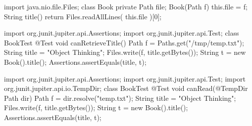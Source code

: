 \documentclass{article}
\begin{document}
\begin{lnSnippet}
import java.nio.file.Files;
class Book {
  private Path file;
  Book(Path f) {
    this.file = f;
  }
  String title() {
    return Files.readAllLines(
      this.file
    )[0];
  }
}
\end{lnSnippet}
\begin{lnSnippet}
import org.junit.jupiter.api.Assertions;
import org.junit.jupiter.api.Test;
class BookTest {
  @Test
  void canRetrieveTitle() {
    Path f = Paths.get("/tmp/temp.txt");
    String title = "Object Thinking";
    Files.write(f, title.getBytes());
    String t = new Book().title();
    Assertions.assertEquals(title, t);
  }
}
\end{lnSnippet}

\begin{lnSnippet}
import org.junit.jupiter.api.Assertions;
import org.junit.jupiter.api.Test;
import org.junit.jupiter.api.io.TempDir;
class BookTest {
  @Test
  void canRead(@TempDir Path dir) {
    Path f = dir.resolve("temp.txt");
    String title = "Object Thinking";
    Files.write(f, title.getBytes());
    String t = new Book().title();
    Assertions.assertEquals(title, t);
  }
}
\end{lnSnippet}



\end{document}
